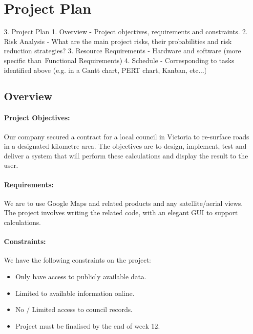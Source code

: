 \documentclass[a4paper,11pt]{article}
\begin{document}
\section{Project Plan}


3. Project Plan
  1. Overview - Project objectives, requirements and constraints.
  2. Risk Analysis - What are the main project risks, their probabilities and risk reduction strategies?
  3. Resource Requirements - Hardware and software (more specific than Functional Requirements)
  4. Schedule - Corresponding to tasks identified above (e.g. in a Gantt chart, PERT chart, Kanban, etc...)


\subsection{Overview}


\paragraph{Project Objectives:}

Our company secured a contract for a local council in Victoria to re-surface
roads in a designated kilometre area. The objectives are to design, implement,
test and deliver a system that will perform these calculations and display the
result to the user.

\paragraph{Requirements:}

We are to use Google Maps and related products and any satellite/aerial views.
The project involves writing the related code, with an elegant GUI to support
calculations.


\paragraph{Constraints:}

We have the following constraints on the project:

\begin{itemize}
  \item Only have access to publicly available data.
  \item Limited to available information online.
  \item No / Limited access to council records.
  \item Project must be finalised by the end of week 12.
\end{itemize}
\end{document}
